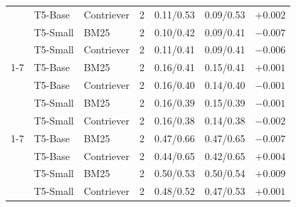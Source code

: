 \documentclass[10pt,twocolumn]{article}
\begin{document}
\begin{table}[t]
\begin{tabular}{@{}lllrllr@{}}
 & T5-Base & Contriever & 2 & 0.11/0.53 & 0.09/0.53 & $+0.002$ \\
 & T5-Small & BM25 & 2 & 0.10/0.42 & 0.09/0.41 & $-0.007$ \\
 & T5-Small & Contriever & 2 & 0.11/0.41 & 0.09/0.41 & $-0.006$ \\
\cmidrule(lr){1-7}
\multirow{4}{*}{LaMP-6} & T5-Base & BM25 & 2 & 0.16/0.41 & 0.15/0.41 & $+0.001$ \\
 & T5-Base & Contriever & 2 & 0.16/0.40 & 0.14/0.40 & $-0.001$ \\
 & T5-Small & BM25 & 2 & 0.16/0.39 & 0.15/0.39 & $-0.001$ \\
 & T5-Small & Contriever & 2 & 0.16/0.38 & 0.14/0.38 & $-0.002$ \\
\cmidrule(lr){1-7}
\multirow{4}{*}{LaMP-7} & T5-Base & BM25 & 2 & 0.47/0.66 & 0.47/0.65 & $-0.007$ \\
 & T5-Base & Contriever & 2 & 0.44/0.65 & 0.42/0.65 & $+0.004$ \\
 & T5-Small & BM25 & 2 & 0.50/0.53 & 0.50/0.54 & $+0.009$ \\
 & T5-Small & Contriever & 2 & 0.48/0.52 & 0.47/0.53 & $+0.001$ \\
\bottomrule
\end{tabular}
\end{table}
\end{document}
